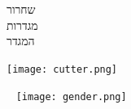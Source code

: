 \vfill

~


\newpage

~

\vfill

\fontsize{170}{170}

\begin{center}
	\vspace{-3cm}
	\noindent
		\hspace{-7cm}שחרור\\
		\hspace{-7cm}מגדרות\\
		\hspace{-7cm}המגדר
\end{center}

\vspace{-16.25cm}
\texttt{[image: cutter.png]}

\vspace{-17.75cm}
~\hfill
\texttt{[image: gender.png]}

\vfill


